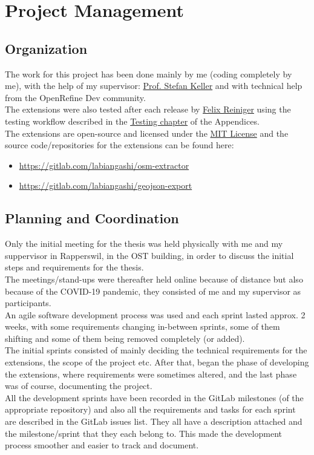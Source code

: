 \chapter{Project Management}
\section{Organization}
The work for this project has been done mainly by me (coding completely by me), with the help of my supervisor: \href{mailto:stefan.keller@ost.ch}{Prof. Stefan Keller}
and with technical help from the OpenRefine Dev community.\\
\newline
The extensions were also tested after each release by \href{mailto:felix.reiniger@ost.ch}{Felix Reiniger} using the testing
workflow described in the \hyperref[sec:test-workflow]{Testing chapter} of the Appendices.\\
\newline
The extensions are open-source and licensed under the \href{https://mit-license.org/}{MIT License} and the
source code/repositories for the extensions can be found here:
\begin{itemize}
    \item \href{https://gitlab.com/labiangashi/osm-extractor}{https://gitlab.com/labiangashi/osm-extractor}
    \item \href{https://gitlab.com/labiangashi/geojson-export}{https://gitlab.com/labiangashi/geojson-export}
\end{itemize}
\pagebreak
\section{Planning and Coordination}
Only the initial meeting for the thesis was held physically with me and my suppervisor in Rapperswil,
in the OST building, in order to discuss the initial steps and requirements for the thesis.\\
\newline
The meetings/stand-ups were thereafter held online because of distance but also because of the COVID-19 pandemic, they consisted of me and my supervisor as participants.\\
An agile software development process was used and each sprint lasted approx. 2 weeks, with some requirements changing in-between sprints,
some of them shifting and some of them being removed completely (or added). \\
\newline
The initial sprints consisted of mainly deciding the technical requirements for the extensions, the scope of the project etc.
After that, began the phase of developing the extensions, where requirements were sometimes altered, and the last phase was of course, documenting the project.\\
\newline
All the development sprints have been recorded in the GitLab milestones (of the appropriate repository) and also all the
requirements and tasks for each sprint are described in the GitLab issues list. They all have a description attached and the
milestone/sprint that they each belong to. This made the development process smoother and easier to track and document.
\pagebreak

